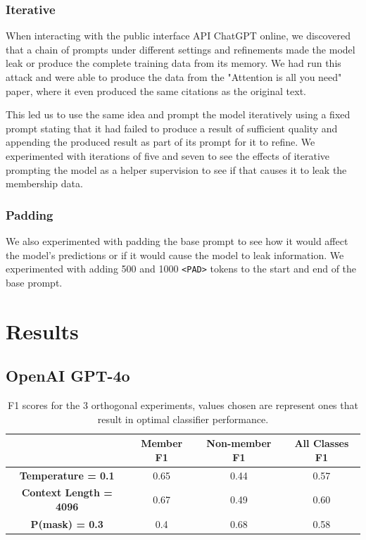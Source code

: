 \documentclass[sigconf]{acmart}
\begin{document}
\subsubsection{Iterative}

When interacting with the public interface API ChatGPT online, we discovered that a chain of prompts under different settings and refinements made the model leak or produce the complete training data from its memory. We had run this attack and were able to produce the data from the "Attention is all you need" paper, where it even produced the same citations as the original text.

This led us to use the same idea and prompt the model iteratively using a fixed prompt stating that it had failed to produce a result of sufficient quality and appending the produced result as part of its prompt for it to refine. We experimented with iterations of five and seven to see the effects of iterative prompting the model as a helper supervision to see if that causes it to leak the membership data. 

\subsubsection{Padding}

We also experimented with padding the base prompt to see how it would affect the model's predictions or if it would cause the model to leak information. We experimented with adding 500 and 1000 \texttt{<PAD>} tokens to the start and end of the base prompt. 

\section{Results}

\subsection{OpenAI GPT-4o}

\begin{table}[]
\begin{tabular}{|c|c|c|c|}
\hline
                               & \textbf{Member F1} & \textbf{Non-member F1} & \textbf{All Classes F1} \\ \hline
\textbf{Temperature = 0.1}     & 0.65               & 0.44                   & 0.57                    \\ \hline
\textbf{Context Length = 4096} & 0.67               & 0.49                   & 0.60                    \\ \hline
\textbf{P(mask) = 0.3}         & 0.4                & 0.68                   & 0.58                    \\ \hline
\end{tabular}
\caption{F1 scores for the 3 orthogonal experiments, values chosen are represent ones that result in optimal classifier performance.}
\label{tab:gpt_f1_table}
\end{table}
\end{document}
